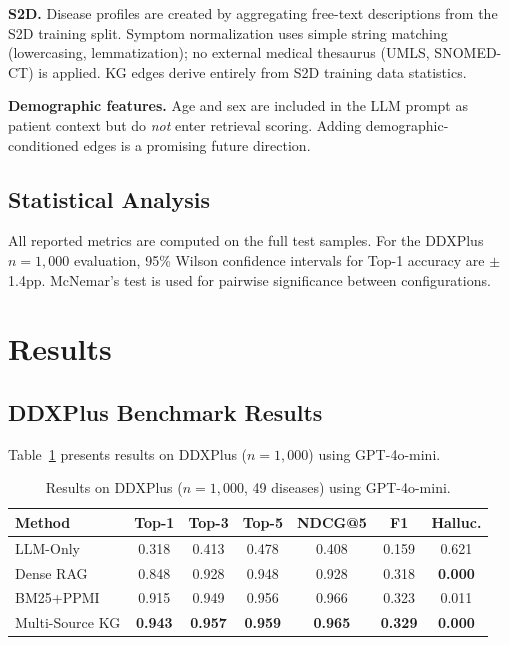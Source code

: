 \documentclass[runningheads]{llncs}
\begin{document}
\textbf{S2D.} Disease profiles are created by aggregating free-text descriptions from the S2D training split. Symptom normalization uses simple string matching (lowercasing, lemmatization); no external medical thesaurus (UMLS, SNOMED-CT) is applied. KG edges derive entirely from S2D training data statistics.

\textbf{Demographic features.} Age and sex are included in the LLM prompt as patient context but do \emph{not} enter retrieval scoring. Adding demographic-conditioned edges is a promising future direction.

\subsection{Statistical Analysis}
\label{sec:stats}

All reported metrics are computed on the full test samples. For the DDXPlus $n{=}1{,}000$ evaluation, 95\% Wilson confidence intervals for Top-1 accuracy are $\pm$1.4pp. McNemar's test is used for pairwise significance between configurations.

\section{Results}
\label{sec:results}

\subsection{DDXPlus Benchmark Results}

Table~\ref{tab:ddxplus} presents results on DDXPlus ($n{=}1{,}000$) using GPT-4o-mini.

\begin{table}[t]
\centering
\caption{Results on DDXPlus ($n{=}1{,}000$, 49 diseases) using GPT-4o-mini.}
\label{tab:ddxplus}
\begin{tabular}{lcccccc}
\toprule
\textbf{Method} & \textbf{Top-1} & \textbf{Top-3} & \textbf{Top-5} & \textbf{NDCG@5} & \textbf{F1} & \textbf{Halluc.} \\
\midrule
LLM-Only       & 0.318 & 0.413 & 0.478 & 0.408 & 0.159 & 0.621 \\
Dense RAG       & 0.848 & 0.928 & 0.948 & 0.928 & 0.318 & \textbf{0.000} \\
BM25+PPMI       & 0.915 & 0.949 & 0.956 & 0.966 & 0.323 & 0.011 \\
Multi-Source KG & \textbf{0.943} & \textbf{0.957} & \textbf{0.959} & \textbf{0.965} & \textbf{0.329} & \textbf{0.000} \\
\bottomrule
\end{tabular}
\end{table}
\end{document}
